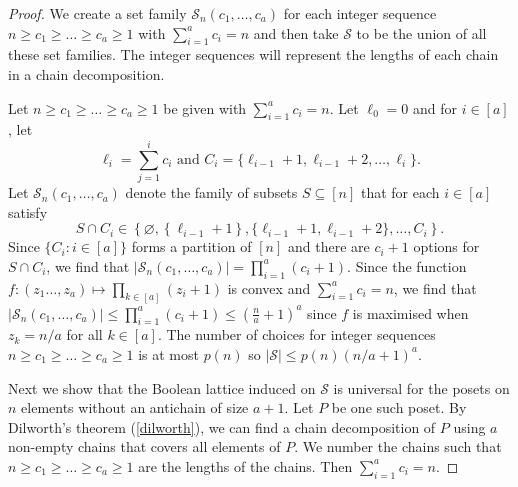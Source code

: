 \documentclass[11pt]{article}
\newcommand{\1}{\mathbbm{1}}
\let\emptyset=\varnothing
\begin{document}
\begin{proof}
We create a set family
$\mathcal{S}_n(c_1,\dots,c_a)$ for each integer sequence $n\geq c_1\geq \dots\geq c_a\geq 1$ with $\sum_{i=1}^ac_i=n$ and then take $\mathcal{S}$ to be the union of all these set families. The integer sequences will represent the lengths of each chain in a chain decomposition.

Let $n\geq c_1\geq \dots\geq c_a\geq 1$ be given with $\sum_{i=1}^ac_i=n$.
Let $\ell_0=0$ and for $i\in [a]$, let 
\[
\ell_i = \sum_{j=1}^i c_i \text{ and }C_i=\{\ell_{i-1}+1,\ell_{i-1}+2,\dots,\ell_i\}.
\]
Let $\mathcal{S}_n(c_1,\dots,c_a)$ denote the family of subsets $S\subseteq[n]$ that for each $i\in[a]$ satisfy
\[
S\cap C_i \in \left\{\emptyset,\left\{\ell_{i-1}+1\right\},\{\ell_{i-1}+1,\ell_{i-1}+2\},\dots,C_i\right\}.
\]
Since $\{C_i:i\in [a]\}$ forms a partition of $[n]$ and there are $c_i+1$ options for $S\cap C_i$, we find that $|\mathcal{S}_n(c_1,\dots,c_a)|=\prod_{i=1}^a(c_i+1)$. Since the function $f : (z_1\ldots,z_a) \mapsto \prod_{k \in [a]} (z_i +1)$ is convex and $\sum_{i=1}^a c_i = n$, we find that  $|\mathcal{S}_n(c_1,\dots,c_a)|\leq\prod_{i=1}^a(c_i+1)\leq  (\frac{n}a+1)^a$ since $f$ is maximised when $z_k = n/a$ for all $k\in [a]$. The number of choices for integer sequences $n\geq c_1\geq \dots\geq c_a\geq 1$ is at most $p(n)$ so $|\mathcal{S}|\leq p(n)(n/a+1)^a$.

Next we show that the Boolean lattice induced on $\mathcal{S}$ is universal for the posets on $n$ elements without an antichain of size $a+1$. Let $P$ be one such poset. By Dilworth's theorem (\cref{dilworth}), we can find a chain decomposition of $P$ using $a$ non-empty chains that covers all elements of $P$. We number the chains such that $n\geq c_1\geq \dots\geq c_a\geq 1$ are the lengths of the chains. Then $\sum_{i=1}^ac_i=n$.


\end{proof}
\end{document}

